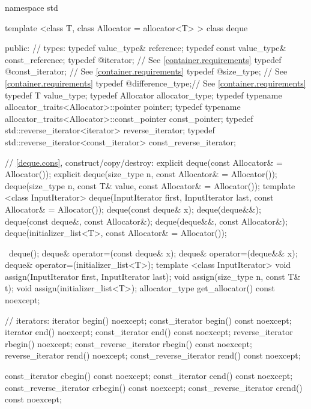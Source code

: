 \begin{codeblock}
namespace std {
  template <class T, class Allocator = allocator<T> >
  class deque {
  public:
    // types:
    typedef value_type&                           reference;
    typedef const value_type&                     const_reference;
    typedef @\impdef@                iterator;       // See \ref{container.requirements}
    typedef @\impdef@                const_iterator; // See \ref{container.requirements}
    typedef @\impdef@                size_type;      // See \ref{container.requirements}
    typedef @\impdef@                difference_type;// See \ref{container.requirements}
    typedef T                                     value_type;
    typedef Allocator                             allocator_type;
    typedef typename allocator_traits<Allocator>::pointer           pointer;
    typedef typename allocator_traits<Allocator>::const_pointer     const_pointer;
    typedef std::reverse_iterator<iterator>       reverse_iterator;
    typedef std::reverse_iterator<const_iterator> const_reverse_iterator;

    // \ref{deque.cons}, construct/copy/destroy:
    explicit deque(const Allocator& = Allocator());
    explicit deque(size_type n, const Allocator& = Allocator());
    deque(size_type n, const T& value, const Allocator& = Allocator());
    template <class InputIterator>
      deque(InputIterator first, InputIterator last, const Allocator& = Allocator());
    deque(const deque& x);
    deque(deque&&);
    deque(const deque&, const Allocator&);
    deque(deque&&, const Allocator&);
    deque(initializer_list<T>, const Allocator& = Allocator());

    ~deque();
    deque& operator=(const deque& x);
    deque& operator=(deque&& x);
    deque& operator=(initializer_list<T>);
    template <class InputIterator>
      void assign(InputIterator first, InputIterator last);
    void assign(size_type n, const T& t);
    void assign(initializer_list<T>);
    allocator_type get_allocator() const noexcept;

    // iterators:
    iterator               begin() noexcept;
    const_iterator         begin() const noexcept;
    iterator               end() noexcept;
    const_iterator         end() const noexcept;
    reverse_iterator       rbegin() noexcept;
    const_reverse_iterator rbegin() const noexcept;
    reverse_iterator       rend() noexcept;
    const_reverse_iterator rend() const noexcept;

    const_iterator         cbegin() const noexcept;
    const_iterator         cend() const noexcept;
    const_reverse_iterator crbegin() const noexcept;
    const_reverse_iterator crend() const noexcept;

}}
\end{codeblock}
